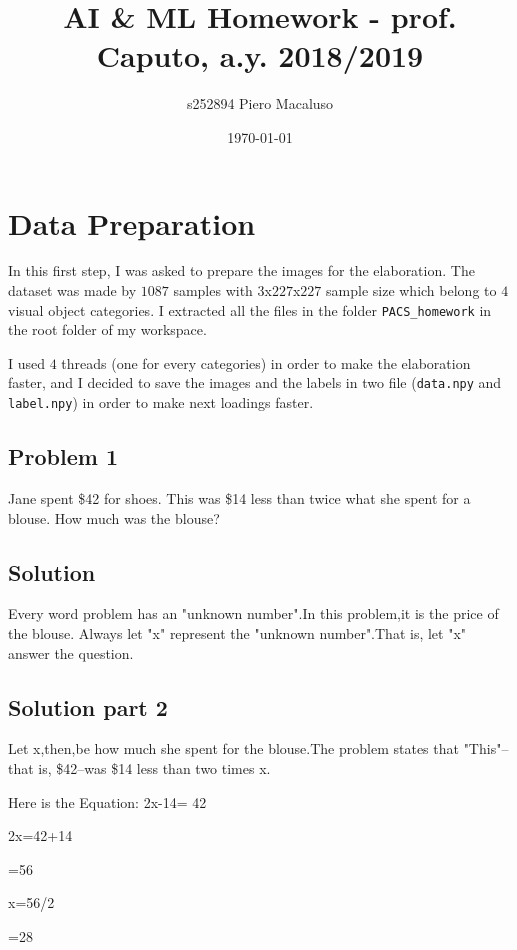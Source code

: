 \documentclass[12pt]{article}%
\begin{document}
\title{AI & ML Homework - prof. Caputo, a.y. 2018/2019}
\author{s252894 Piero Macaluso}
\date{\today}
\maketitle
\section{Data Preparation}
In this first step, I was asked to prepare the images for the elaboration. The dataset was made by $1087$ samples with $3$x$227$x$227$ sample size which belong to $4$ visual object categories.
I extracted all the files in the folder \texttt{PACS\_homework} in the root folder of my workspace.

I used $4$ threads (one for every categories) in order to make the elaboration faster, and I decided to save the images and the labels in two file (\texttt{data.npy} and \texttt{label.npy}) in order to make next loadings faster.


\subsection{Problem 1}
Jane spent \$42 for shoes. This was \$14 less than twice what she spent for a blouse. How much was the blouse?
\subsection{Solution}
Every word problem has an "unknown number".In this problem,it is the price of the blouse. Always let "x" represent the "unknown number".That is, let "x" answer the question.
\subsection{Solution part 2}
Let x,then,be how much she spent for the blouse.The problem states that "This"--that is, \$42--was \$14 less than two times x.

           Here is the Equation: 2x-14= 42
                                 
                                 2x=42+14
                                 
                                 =56
                                 
                                 x=56/2
                                 
                                 =28
\end{document}

